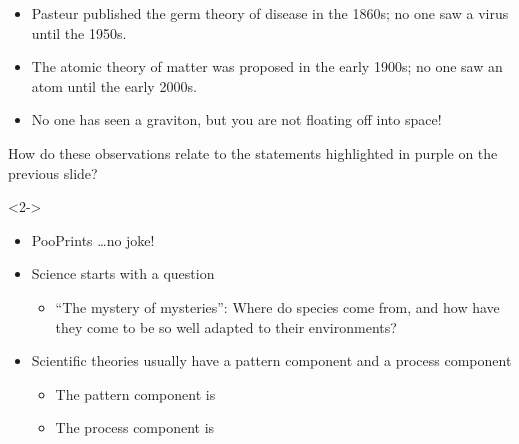 \begin{frame}
    \begin{itemize}
        \item Pasteur published the germ theory of disease in the 1860s; no one
            saw a virus until the 1950s.
        \item The atomic theory of matter was proposed in the early 1900s; no
            one saw an atom until the early 2000s.
        \item No one has seen a graviton, but you are not floating off into
            space!
    \end{itemize}

    How do these observations relate to the statements highlighted in purple on
    the previous slide?

    \begin{uncoverenv}<2->
    \begin{itemize}
        \item PooPrints \ldots no joke!
    \end{itemize}
    \end{uncoverenv}

\end{frame}

\begin{frame}
    \begin{itemize}
        \item<1-> Science starts with a question
        \begin{itemize}
            \item ``The mystery of mysteries'': Where do species come from, and
                how have they come to be so well adapted to their environments?
        \end{itemize}
        \item<2-> Scientific theories usually have a pattern component and a
            process component
        \begin{itemize}
            \item The pattern component is
                \vspace{1cm}
            \item The process component is
        \end{itemize}
\end{itemize}
\end{frame}

